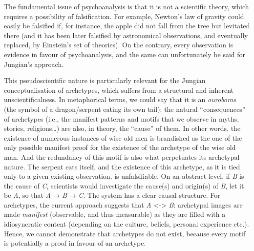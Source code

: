 \documentclass[
]{book}
\begin{document}
The fundamental issue of psychoanalysis is that it is not a scientific theory, which requires a possibility of falsification. For example, Newton's law of gravity could easily be falsified if, for instance, the apple did not fall from the tree but levitated there (and it has been later falsified by astronomical observations, and eventually replaced, by Einstein's set of theories). On the contrary, every observation is evidence in favour of psychoanalysis, and the same can unfortunately be said for Jungian's approach.

This pseudoscientific nature is particularly relevant for the Jungian conceptualisation of archetypes, which suffers from a structural and inherent unscientificalness. In metaphorical terms, we could say that it is an \emph{ouroboros} (the symbol of a dragon/serpent eating its own tail): the natural ``consequences'' of archetypes (i.e., the manifest patterns and motifs that we observe in myths, stories, religions\ldots) are also, in theory, the ``cause'' of them. In other words, the existence of numerous instances of wise old men is brandished as the one of the only possible manifest proof for the existence of the archetype of the wise old man. And the redundancy of this motif is also what perpetuates its archetypal nature. The serpent eats itself, and the existence of this archetype, as it is tied only to a given existing observation, is unfalsifiable. On an abstract level, if \emph{B} is the cause of \emph{C}, scientists would investigate the cause(s) and origin(s) of \emph{B}, let it be \emph{A}, so that \emph{A} → \emph{B} → \emph{C}. The system has a clear causal structure. For archetypes, the current approach suggests that \emph{A} \textless-\textgreater{} \emph{B}: archetypal images are made \emph{manifest} (observable, and thus measurable) as they are filled with a idiosyncratic content (depending on the culture, beliefs, personal experience etc.). Hence, we cannot demonstrate that archetypes do not exist, because every motif is potentially a proof in favour of an archetype.
\end{document}
